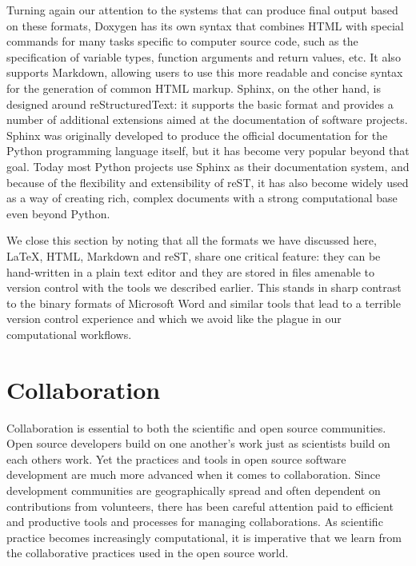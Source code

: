 \documentclass[ChapterTOCs,krantz2]{krantz} %
\begin{document}
Turning again our attention to the systems that can produce final output based
on these formats, Doxygen has its own syntax that combines HTML with special
commands for many tasks specific to computer source code, such as the
specification of variable types, function arguments and return values, etc.  It
also supports Markdown, allowing users to use this more readable and concise
syntax for the generation of common HTML markup.  Sphinx, on the other hand, is
designed around reStructuredText: it supports the basic format and provides a
number of additional extensions aimed at the documentation of software
projects. Sphinx was originally developed to produce the official documentation
for the Python programming language itself, but it has become very popular
beyond that goal.  Today most Python projects use Sphinx as their documentation
system, and because of the flexibility and extensibility of reST, it has also
become widely used as a way of creating rich, complex documents with a strong
computational base even beyond Python.

We close this section by noting that all the formats we have discussed
here, \LaTeX{}, HTML, Markdown and reST, share one critical feature: they can
be hand-written in a plain text editor and they are stored in files amenable to
version control with the tools we described earlier.  This stands in sharp
contrast to the binary formats of Microsoft Word and similar tools that lead to
a terrible version control experience and which we avoid like the plague in our
computational workflows.

\section{\label{sec:collaboration}Collaboration}

Collaboration is essential to both the scientific and open source communities.
Open source developers build on one another's work just as scientists build on
each others work.  Yet the practices and tools in open source software
development are much more advanced when it comes to collaboration. Since
development communities are geographically spread and often dependent on
contributions from volunteers, there has been careful attention paid to
efficient and productive tools and processes for managing collaborations.  As
scientific practice becomes increasingly computational, it is imperative that
we learn from the collaborative practices used in the open source world.
\end{document}
